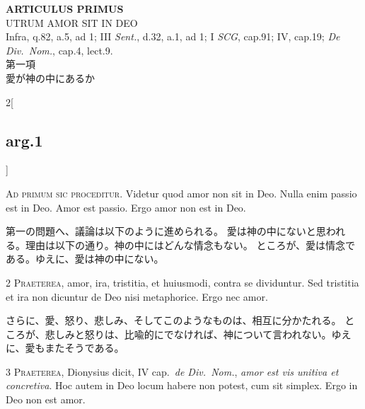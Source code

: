 \documentclass[paper=a4paper,fontsize=10pt,jafontsize=9pt,titlepage]{jlreq}
\begin{document}
{}
\setcounter{section}{1}
\setcounter{subsection}{0}
\begin{center}
 {\Large {\bfseries ARTICULUS PRIMUS}}\\
 {\large UTRUM AMOR SIT IN DEO}\\
 {\footnotesize Infra, q.82, a.5, ad 1; III {\itshape Sent.}, d.32, a.1,
 ad 1; I {\itshape SCG}, cap.91; IV, cap.19; {\itshape De Div.~Nom.},
 cap.4, lect.9.}\\
 {\Large 第一項\\愛が神の中にあるか}
\end{center}

\begin{paracol}{2}[\subsection{arg.1}]


{\Huge A}{\scshape d primum sic proceditur}. Videtur quod amor
non sit in Deo. Nulla enim passio est in Deo. Amor est passio. Ergo amor
non est in Deo.

\switchcolumn

第一の問題へ、議論は以下のように進められる。
愛は神の中にないと思われる。理由は以下の通り。神の中にはどんな情念もない。
 ところが、愛は情念である。ゆえに、愛は神の中にない。



{\scshape 2 Praeterea}, amor, ira, tristitia, et
huiusmodi, contra se dividuntur. Sed tristitia et ira non dicuntur de
Deo nisi metaphorice. Ergo nec amor.

\switchcolumn

さらに、愛、怒り、悲しみ、そしてこのようなものは、相互に分かたれる。
ところが、悲しみと怒りは、比喩的にでなければ、神について言われない。ゆえ
 に、愛もまたそうである。



{\scshape 3 Praeterea}, Dionysius dicit, IV cap.~{\itshape de
Div.~Nom.}, {\itshape amor est vis unitiva et concretiva}. Hoc autem in Deo locum
habere non potest, cum sit simplex. Ergo in Deo non est amor.


\end{paracol}
\end{document}

